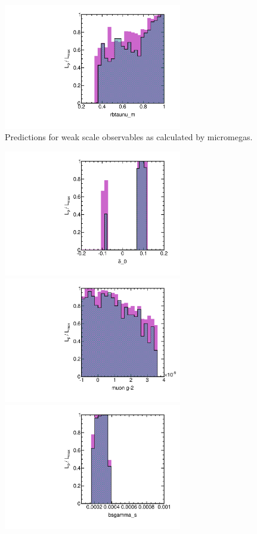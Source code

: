 \begin{figure}[htbp]
\begin{center}
\includegraphics[height=5.5cm]{figs/fig_rbtaunu_m.pdf} 
\caption{Predictions for weak scale observables as calculated by micromegas.}
\label{default}
\end{center}
\end{figure}


\begin{figure}[htbp]
\begin{center}
\includegraphics[height=5.5cm]{figs/fig_delta0_s.pdf} 
\includegraphics[height=5.5cm]{figs/fig_muon_gm2_s.pdf} \\
\includegraphics[height=5.5cm]{figs/fig_bsgamma_s.pdf} 

\end{center}
\end{figure}
